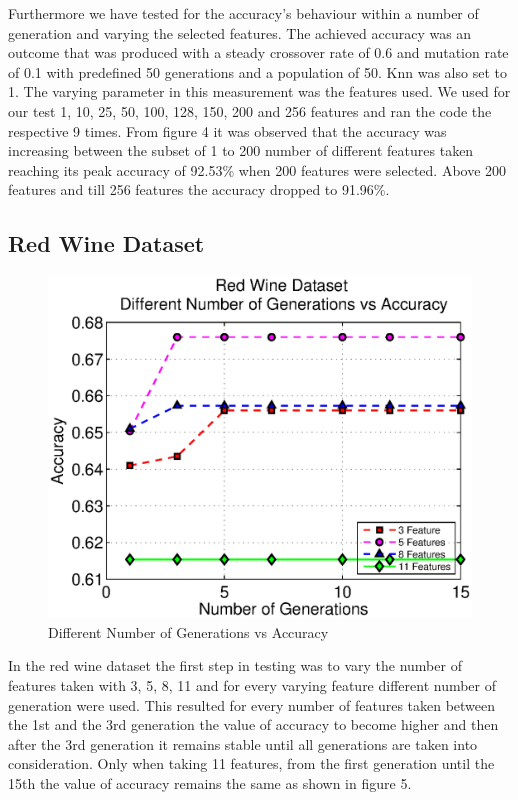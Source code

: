 \documentclass[11pt,onecolumn,a4paper]{article}
\begin{document}
    
    
    
    Furthermore we have tested for the accuracy's behaviour within a number of generation and varying the selected features. The achieved accuracy was an outcome that was produced with a steady crossover rate of 0.6 and mutation rate of 0.1 with predefined 50 generations and a population of 50. Knn was also set to 1. The varying parameter in this measurement was the features used. We used for our test 1, 10, 25, 50, 100, 128, 150, 200 and 256 features and ran the code the respective 9 times. From figure 4 it was observed that the accuracy was increasing between the subset of 1 to 200 number of different features taken reaching its peak accuracy of 92.53\% when 200 features were selected. Above 200 features and till 256 features the accuracy dropped to 91.96\%.    

\subsection{Red Wine Dataset }

  \begin{figure}[h!]
      \centering
      \includegraphics[width=0.6\linewidth]{img/winefeat.eps}
      \caption{Different Number of Generations vs Accuracy}
   \end{figure}
 In the red wine dataset the first step in testing was to vary the number of features taken with 3, 5, 8, 11 and for every varying  feature different number of generation were used. This resulted for every number of features taken between the 1st and the 3rd generation the value of accuracy to become higher and then after the 3rd generation it remains stable until all generations are taken into consideration. Only when taking 11 features, from the first generation until the 15th the value of accuracy remains the same as shown in figure 5.    
   
\end{document}
